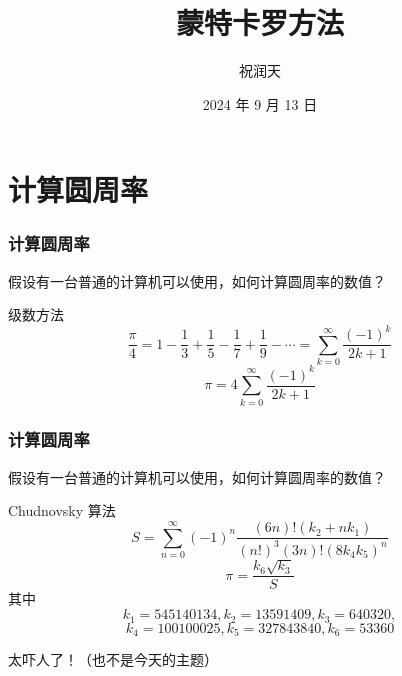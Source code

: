 \documentclass{beamer}
\title{蒙特卡罗方法}
\author{祝润天}
\institute{复旦大学计算机科学技术学院}
\date{2024 年 9 月 13 日}
\begin{document}
\begin{frame}
    
    \maketitle

\end{frame}

\section{计算圆周率}

\begin{frame}
    \frametitle{计算圆周率}

    \begin{problem}
        假设有一台普通的计算机可以使用，如何计算圆周率的数值？       
    \end{problem}

    \pause

    \begin{block}{级数方法}
        $$\frac{\pi}{4} = 1 - \frac{1}{3} + \frac{1}{5} - \frac{1}{7} + \frac{1}{9} - \cdots = \sum_{k = 0}^{\infty} \frac{(-1)^k}{2k + 1}$$
        $$\pi = 4\sum_{k = 0}^{\infty} \frac{(-1)^k}{2k + 1}$$
    \end{block}

\end{frame}

\begin{frame}
    \frametitle{计算圆周率}

    \begin{problem}
        假设有一台普通的计算机可以使用，如何计算圆周率的数值？       
    \end{problem}

    \begin{block}{Chudnovsky 算法}
        $$S = \sum_{n = 0}^{\infty} (-1)^n \frac{(6n)!(k_2+nk_1)}{(n!)^3(3n)!(8k_4k_5)^n}$$
        $$\pi = \frac{k_6\sqrt{k_3}}{S}$$
        其中
        $$k_1 = 545140134, k_2 = 13591409, k_3 = 640320,$$
        $$k_4 = 100100025, k_5 = 327843840, k_6 = 53360$$
    \end{block}
    太吓人了！（也不是今天的主题）

\end{frame}
\end{document}
